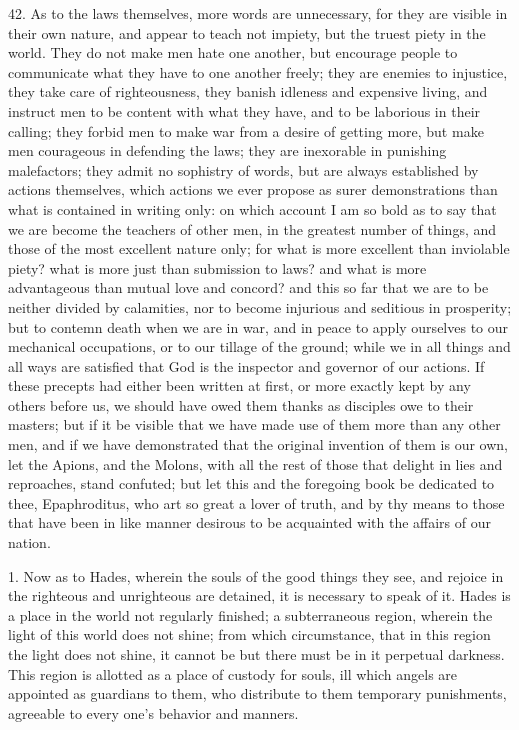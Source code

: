 42. As to the laws themselves, more words are unnecessary, for they are
visible in their own nature, and appear to teach not impiety, but the
truest piety in the world. They do not make men hate one another, but
encourage people to communicate what they have to one another freely; they
are enemies to injustice, they take care of righteousness, they banish
idleness and expensive living, and instruct men to be content with what
they have, and to be laborious in their calling; they forbid men to make
war from a desire of getting more, but make men courageous in defending
the laws; they are inexorable in punishing malefactors; they admit no
sophistry of words, but are always established by actions themselves,
which actions we ever propose as surer demonstrations than what is
contained in writing only: on which account I am so bold as to say that we
are become the teachers of other men, in the greatest number of things,
and those of the most excellent nature only; for what is more excellent
than inviolable piety? what is more just than submission to laws? and what
is more advantageous than mutual love and concord? and this so far that we
are to be neither divided by calamities, nor to become injurious and
seditious in prosperity; but to contemn death when we are in war, and in
peace to apply ourselves to our mechanical occupations, or to our tillage
of the ground; while we in all things and all ways are satisfied that God
is the inspector and governor of our actions. If these precepts had either
been written at first, or more exactly kept by any others before us, we
should have owed them thanks as disciples owe to their masters; but if it
be visible that we have made use of them more than any other men, and if
we have demonstrated that the original invention of them is our own, let
the Apions, and the Molons, with all the rest of those that delight in
lies and reproaches, stand confuted; but let this and the foregoing book
be dedicated to thee, Epaphroditus, who art so great a lover of truth, and
by thy means to those that have been in like manner desirous to be
acquainted with the affairs of our nation.


1. Now as to Hades, wherein the souls of the good things they see,
and rejoice in the righteous and unrighteous are detained, it is necessary
to speak of it. Hades is a place in the world not regularly finished; a
subterraneous region, wherein the light of this world does not shine; from
which circumstance, that in this region the light does not shine, it
cannot be but there must be in it perpetual darkness. This region is
allotted as a place of custody for souls, ill which angels are appointed
as guardians to them, who distribute to them temporary punishments,
agreeable to every one's behavior and manners.

